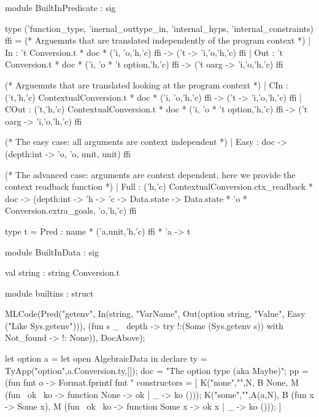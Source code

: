 \documentclass[a4paper, 11pt]{book}
\begin{document}
\begin{ocamlcode}
module BuiltInPredicate : sig

type ('function_type, 'inernal_outtype_in, 'internal_hyps, 'internal_constraints) ffi =
  (* Arguemnts that are translated independently of the program context *)
  | In    : 't Conversion.t * doc * ('i, 'o,'h,'c) ffi -> ('t -> 'i,'o,'h,'c) ffi
  | Out   : 't Conversion.t * doc * ('i, 'o * 't option,'h,'c) ffi -> ('t oarg -> 'i,'o,'h,'c) ffi

  (* Arguemnts that are translated looking at the program context *)
  | CIn    : ('t,'h,'c) ContextualConversion.t * doc * ('i, 'o,'h,'c) ffi -> ('t -> 'i,'o,'h,'c) ffi
  | COut   : ('t,'h,'c) ContextualConversion.t * doc * ('i, 'o * 't option,'h,'c) ffi -> ('t oarg -> 'i,'o,'h,'c) ffi

  (* The easy case: all arguments are context independent *)
  | Easy : doc -> (depth:int -> 'o, 'o, unit, unit) ffi

  (* The advanced case: arguments are context dependent, here we provide the
    context readback function *)
  | Full : ('h,'c) ContextualConversion.ctx_readback * doc -> (depth:int -> 'h -> 'c -> Data.state -> Data.state * 'o * Conversion.extra_goals, 'o,'h,'c) ffi

type t = Pred : name * ('a,unit,'h,'c) ffi * 'a -> t
\end{ocamlcode}

  
\begin{ocamlcode}
  module BuiltInData : sig

  val string : string Conversion.t

  module builtins : struct

  MLCode(Pred("getenv",
  In(string,  "VarName",
  Out(option string, "Value",
  Easy      ("Like Sys.getenv"))),
(fun s _ ~depth ->
   try !:(Some (Sys.getenv s))
   with Not_found -> !: None)),
DocAbove);

\end{ocamlcode}

\begin{ocamlcode}
let option a = let open AlgebraicData in declare {
  ty = TyApp("option",a.Conversion.ty,[]);
  doc = "The option type (aka Maybe)";
  pp = (fun fmt o -> Format.fprintf fmt "%
  constructors = [
    K("none","",N,
      B None,
      M (fun ~ok ~ko -> function None -> ok | _ -> ko ())); 
    K("some","",A(a,N),
      B (fun x -> Some x),
      M (fun ~ok ~ko -> function Some x -> ok x | _ -> ko ())); 
  ]
}
\end{ocamlcode}
\end{document}
